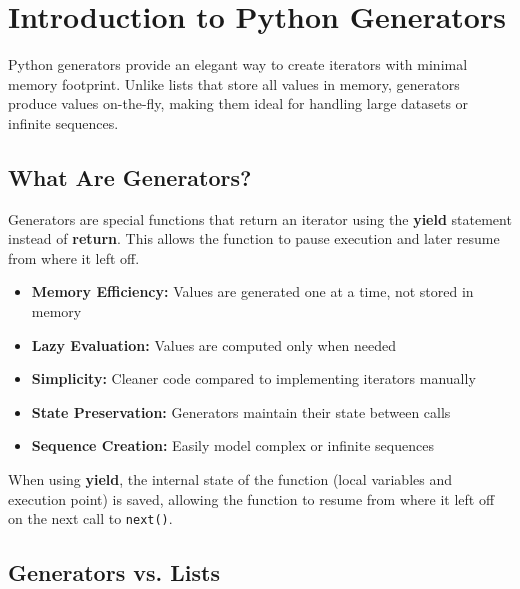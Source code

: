 \documentclass[12pt,letterpaper]{article}
\begin{document}
\setlength{\parindent}{0pt}

\begin{titlepage}
    \titlepagecontents
\end{titlepage}

\section{Introduction to Python Generators}

Python generators provide an elegant way to create iterators with minimal memory footprint. Unlike lists that store all values in memory, generators produce values on-the-fly, making them ideal for handling large datasets or infinite sequences.

\subsection{What Are Generators?}

Generators are special functions that return an iterator using the \textbf{\textcolor{accentColor}{yield}} statement instead of \textbf{\textcolor{pythonBlue}{return}}. This allows the function to pause execution and later resume from where it left off.

\begin{itemize}
    \item \textbf{\textcolor{pythonBlue}{Memory Efficiency:}} Values are generated one at a time, not stored in memory
    \item \textbf{\textcolor{pythonBlue}{Lazy Evaluation:}} Values are computed only when needed
    \item \textbf{\textcolor{pythonBlue}{Simplicity:}} Cleaner code compared to implementing iterators manually
    \item \textbf{\textcolor{pythonBlue}{State Preservation:}} Generators maintain their state between calls
    \item \textbf{\textcolor{pythonBlue}{Sequence Creation:}} Easily model complex or infinite sequences
\end{itemize}

When using \textbf{\textcolor{accentColor}{yield}}, the internal state of the function (local variables and execution point) is saved, allowing the function to resume from where it left off on the next call to \texttt{next()}.

\subsection{Generators vs. Lists}
\end{document}
